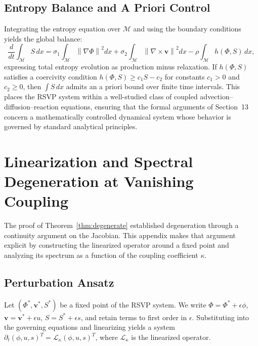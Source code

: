 \documentclass[11pt, a4paper]{article}
\theoremstyle{plain}
\theoremstyle{definition}
\newcommand{\Phifield}{\Phi}
\newcommand{\vfield}{\mathbf{v}}
\newcommand{\Sfield}{S}
\newcommand{\statespace}{\mathcal{M}}
\newcommand{\coupling}{\kappa}
\newcommand{\norm}[1]{\left\lVert #1 \right\rVert}
\begin{document}
\subsection{Entropy Balance and A Priori Control}

Integrating the entropy equation over $\statespace$ and using the boundary
conditions yields the global balance:
\[
  \frac{d}{dt} \int_{\statespace} \Sfield \, dx
  =
  \sigma_1 \int_{\statespace} \norm{\nabla \Phifield}^2 dx
  + \sigma_2 \int_{\statespace} \norm{\nabla \times \vfield}^2 dx
  - \rho \int_{\statespace} h(\Phifield, \Sfield)\, dx,
\]
expressing total entropy evolution as production minus relaxation.
If $h(\Phifield, \Sfield)$ satisfies a coercivity condition
$h(\Phifield, \Sfield) \geq c_1 \Sfield - c_2$ for constants $c_1 > 0$
and $c_2 \geq 0$, then $\int \Sfield\, dx$ admits an a priori bound over
finite time intervals. This places the RSVP system within a well-studied class
of coupled advection--diffusion--reaction equations, ensuring that the formal
arguments of Section~13 concern a mathematically controlled dynamical system
whose behavior is governed by standard analytical principles.

\section{Linearization and Spectral Degeneration at Vanishing Coupling}

The proof of Theorem~\ref{thm:degenerate} established degeneration through
a continuity argument on the Jacobian. This appendix makes that argument
explicit by constructing the linearized operator around a fixed point and
analyzing its spectrum as a function of the coupling coefficient $\coupling$.

\subsection{Perturbation Ansatz}

Let $(\Phifield^*, \vfield^*, \Sfield^*)$ be a fixed point of the RSVP
system. We write $\Phifield = \Phifield^* + \epsilon \phi$,
$\vfield = \vfield^* + \epsilon u$, $\Sfield = \Sfield^* + \epsilon s$,
and retain terms to first order in $\epsilon$. Substituting into the
governing equations and linearizing yields a system
$\partial_t (\phi, u, s)^T = \mathcal{L}_\coupling (\phi, u, s)^T$,
where $\mathcal{L}_\coupling$ is the linearized operator.
\end{document}
